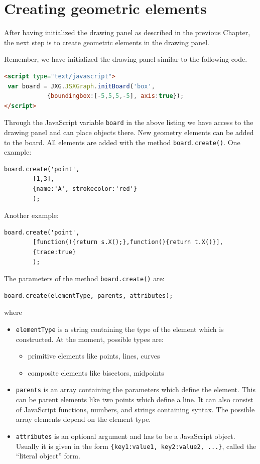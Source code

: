\chapter{Creating geometric elements}
\label{ch:create}
After having initialized the drawing panel as described in the previous Chapter, %
the next step is to create geometric elements in the drawing panel.

Remember, we have initialized the drawing panel similar to the following code.
\begin{lstlisting}[language=HTML]
<script type="text/javascript">
 var board = JXG.JSXGraph.initBoard('box', 
            {boundingbox:[-5,5,5,-5], axis:true});
</script>
\end{lstlisting}
Through the JavaScript variable \lstinline|board| in the above listing we have access to the drawing panel 
and can place objects there. New geometry elements can be added to the board. 
All elements are added with the method \lstinline|board.create()|. One example:
\begin{lstlisting}
board.create('point', 
        [1,3], 
        {name:'A', strokecolor:'red'}
        );
\end{lstlisting}
Another example:
\begin{lstlisting}
board.create('point', 
        [function(){return s.X();},function(){return t.X()}], 
        {trace:true}
        );
\end{lstlisting}
The parameters of the method \lstinline|board.create()| are:
\begin{lstlisting}
board.create(elementType, parents, attributes);
\end{lstlisting}
where
\begin{itemize}
    \item \lstinline|elementType| is a string containing the type of the element which is constructed. 
       At the moment, possible types are:
        \begin{itemize}
          \item primitive elements like points, lines, curves
          \item composite elements like bisectors, midpoints 
        \end{itemize}
    \item \lstinline|parents| is an array containing the parameters which define the element. 
    This can be parent elements like two points which define a line. It can also consist of JavaScript functions, numbers, and strings containing \geonext{} syntax. The possible array elements depend on the element type.
    \item \lstinline|attributes| is an optional argument and has to be a JavaScript object. 
    Usually it is given in the form 
    \lstinline|{key1:value1, key2:value2, ...}|, called the ``literal object'' form.
\end{itemize}



